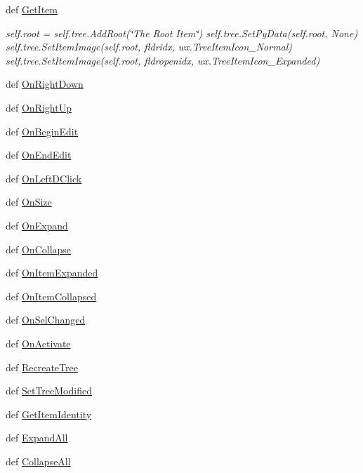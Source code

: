 \begin{DoxyCompactItemize}
\item 
def \hyperlink{namespacetree_a086fab4ad54004db618910da32a2849e}{GetItem}
\begin{DoxyCompactList}\small\item\em self.root = self.tree.AddRoot(\char`\"{}The Root Item\char`\"{}) self.tree.SetPyData(self.root, None) self.tree.SetItemImage(self.root, fldridx, wx.TreeItemIcon\_\-Normal) self.tree.SetItemImage(self.root, fldropenidx, wx.TreeItemIcon\_\-Expanded) \item\end{DoxyCompactList}\item 
def \hyperlink{namespacetree_aa00c842d573e5552c662b5fd1fa1c26a}{OnRightDown}
\item 
def \hyperlink{namespacetree_a5e44cc3fad7655cdd568c2276f4391a2}{OnRightUp}
\item 
def \hyperlink{namespacetree_adcce533e7fcd3c8235c26125229867c8}{OnBeginEdit}
\item 
def \hyperlink{namespacetree_a9e40112ab7c6ffcb3419fae08edb9563}{OnEndEdit}
\item 
def \hyperlink{namespacetree_a93fd5476fb09c688237ea3ff343f085c}{OnLeftDClick}
\item 
def \hyperlink{namespacetree_ac72bcd6136af4eea9dc06cfee1f1d24a}{OnSize}
\item 
def \hyperlink{namespacetree_a5410148429c50c884b84f6e26bce48d7}{OnExpand}
\item 
def \hyperlink{namespacetree_aa3ee8c84f15f385407b67d3a01f324a4}{OnCollapse}
\item 
def \hyperlink{namespacetree_a7bf50c066f74a62b4763849454e10a2c}{OnItemExpanded}
\item 
def \hyperlink{namespacetree_a76d600fd54383428463e3b1500f708e5}{OnItemCollapsed}
\item 
def \hyperlink{namespacetree_aa2ac43e21497dad4a166aed75c04e5d3}{OnSelChanged}
\item 
def \hyperlink{namespacetree_a26991aaaa16d3bafb123acae5a0140db}{OnActivate}
\item 
def \hyperlink{namespacetree_a9d5b276fff7823cd7aa5a31d8af15f58}{RecreateTree}
\item 
def \hyperlink{namespacetree_aa3a4caf6d16485c48ec72b863be84b31}{SetTreeModified}
\item 
def \hyperlink{namespacetree_ac5136a690dd5671aff175511c1e8b269}{GetItemIdentity}
\item 
def \hyperlink{namespacetree_a1708bde1ac7b61350f5c2176a7f4b2fd}{ExpandAll}
\item 
def \hyperlink{namespacetree_ab585b5906ff931f9eeeadf1a2d2059f1}{CollapseAll}
\end{DoxyCompactItemize}
